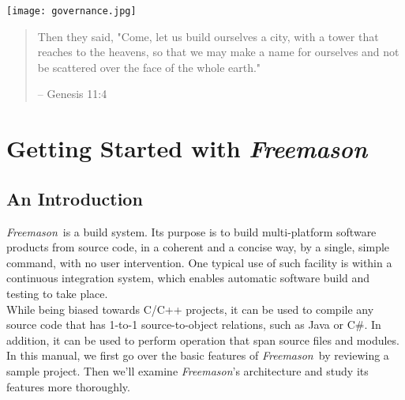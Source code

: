 \documentclass[a4paper]{article}
\newcommand{\freemason}{\textit{Freemason}}
\begin{document}
\watermarkgraphic{}
\draftstring{}
\watermark

\begin{center}
\texttt{[image: governance.jpg]}
\end{center}
\begin{quote}
    Then they said, "Come, let us build ourselves a city, with a tower that reaches to the heavens,
    so that we may make a name for ourselves and not be scattered over the face of the whole earth."

    -- Genesis 11:4
\end{quote}

\newpage


\tableofcontents
\newpage


\setcounter{page}{1}
\pagestyle{headings}

\part{Getting Started with \freemason}

\chapter{An Introduction}

\freemason\ is a build system. Its purpose is to build multi-platform software products from source code,
in a coherent and a concise way, by a single, simple command, with no user intervention.
One typical use of such facility is within a continuous integration system, which enables automatic
software build and testing to take place.
\\
While being biased towards C/C++ projects, it can be used to compile any source code that has 1-to-1 source-to-object
relations, such as Java or C\#. In addition, it can be used to perform operation that span source files and modules.
\\
In this manual, we first go over the basic features of \freemason\ by reviewing a sample project. Then we'll examine
\freemason's architecture and study its features more thoroughly.
\end{document}
